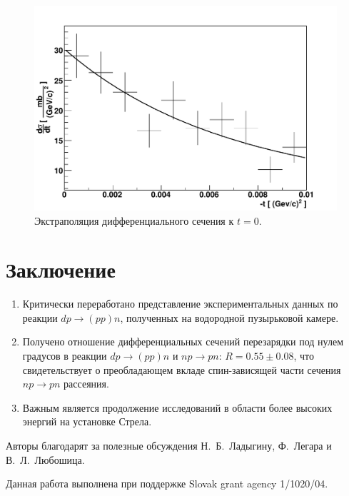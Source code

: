 \documentclass[a4paper,12pt]{article}
\begin{document}
\begin{figure}[h]
  \centering
  \includegraphics[width=1.00\textwidth]{fig_2p.pdf}
  \caption {Экстраполяция дифференциального сечения к $t = 0$.}
  \label{f_2p}
\end{figure}

\section {Заключение}
\begin {enumerate}
\item Критически переработано представление экспериментальных данных
  по реакции $dp\to(pp)n$, полученных на водородной пузырьковой
  камере.
\item Получено отношение дифференциальных сечений перезарядки под
  нулем градусов в реакции $dp\to(pp)n$ и $np\to pn$: $R = 0.55 \pm
  0.08$, что свидетельствует о преобладающем вкладе спин-зависящей
  части сечения $np\to pn$ рассеяния.
\item Важным является продолжение исследований в области более высоких
  энергий на установке Стрела.
\end {enumerate}

Авторы благодарят за полезные обсуждения Н.~Б.~Ладыгину, Ф.~Легара и
В.~Л.~Любошица.

Данная работа выполнена при поддержке Slovak grant agency 1/1020/04.
\end{document}
